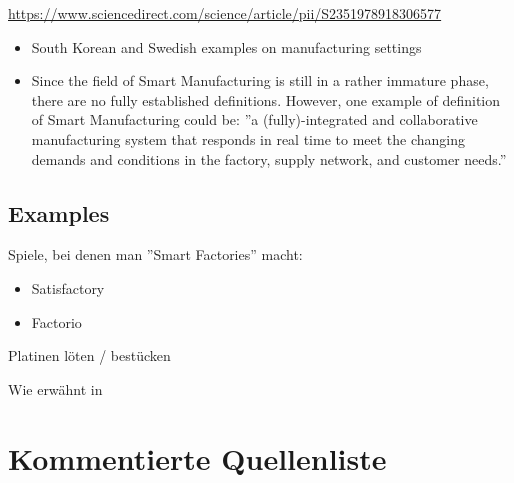 \documentclass[11pt,titlepage]{article}
\begin{document}
  \url{https://www.sciencedirect.com/science/article/pii/S2351978918306577}
  \begin{itemize}
    \item South Korean and Swedish examples on manufacturing settings
    \item Since the field of Smart Manufacturing is still in a rather immature phase, there are no fully established
    definitions. However, one example of definition of Smart Manufacturing could be: ''a (fully)-integrated and
    collaborative manufacturing system that responds in real time to meet the changing demands and conditions in the
    factory, supply network, and customer needs.''
  \end{itemize}


  \subsection{Examples}
  \label{sec:Brainstorm_Examples}

  Spiele, bei denen man ''Smart Factories'' macht:
  \begin{itemize}
    \item Satisfactory 
    \item Factorio
  \end{itemize}


Platinen löten / bestücken

Wie erwähnt in \cite{RICHARDS.2020}

\pagebreak

\section{Kommentierte Quellenliste}
\label{sec:KommentierteQuellenliste}
  
\begingroup
\renewcommand{\section}[2]{}%


\endgroup  
  
\end{document}
